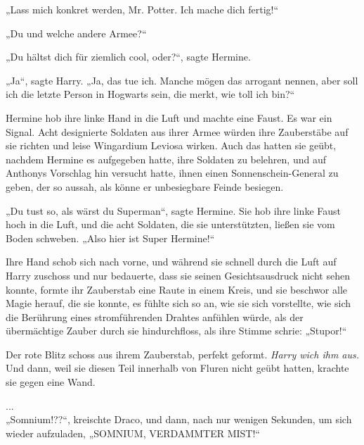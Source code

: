 {„Lass mich konkret werden, Mr. Potter. Ich mache dich fertig!“

„Du und welche andere Armee?“

„Du hältst dich für ziemlich cool, oder?“, sagte Hermine.

„Ja“, sagte Harry. „Ja, das tue ich. Manche mögen das arrogant nennen, aber soll ich die letzte Person in Hogwarts sein, die merkt, wie toll ich bin?“

Hermine hob ihre linke Hand in die Luft und machte eine Faust. Es war ein Signal. Acht designierte Soldaten aus ihrer Armee würden ihre Zauberstäbe auf sie richten und leise Wingardium Leviosa wirken. Auch das hatten sie geübt, nachdem Hermine es aufgegeben hatte, ihre Soldaten zu belehren, und auf Anthonys Vorschlag hin versucht hatte, ihnen einen Sonnenschein-General zu geben, der so aussah, als könne er unbesiegbare Feinde besiegen.

„Du tust so, als wärst du Superman“, sagte Hermine. Sie hob ihre linke Faust hoch in die Luft, und die acht Soldaten, die sie unterstützten, ließen sie vom Boden schweben. „Also hier ist Super Hermine!“

Ihre Hand schob sich nach vorne, und während sie schnell durch die Luft auf Harry zuschoss und nur bedauerte, dass sie seinen Gesichtsausdruck nicht sehen konnte, formte ihr Zauberstab eine Raute in einem Kreis, und sie beschwor alle Magie herauf, die sie konnte, es fühlte sich so an, wie sie sich vorstellte, wie sich die Berührung eines stromführenden Drahtes anfühlen würde, als der übermächtige Zauber durch sie hindurchfloss, als ihre Stimme schrie: „Stupor!“

Der rote Blitz schoss aus ihrem Zauberstab, perfekt geformt. \emph{Harry wich ihm aus.} Und dann, weil sie diesen Teil innerhalb von Fluren nicht geübt hatten, krachte sie gegen eine Wand.

...\\ „Somnium!??“, kreischte Draco, und dann, nach nur wenigen Sekunden, um sich wieder aufzuladen, „SOMNIUM, VERDAMMTER MIST!“

}
